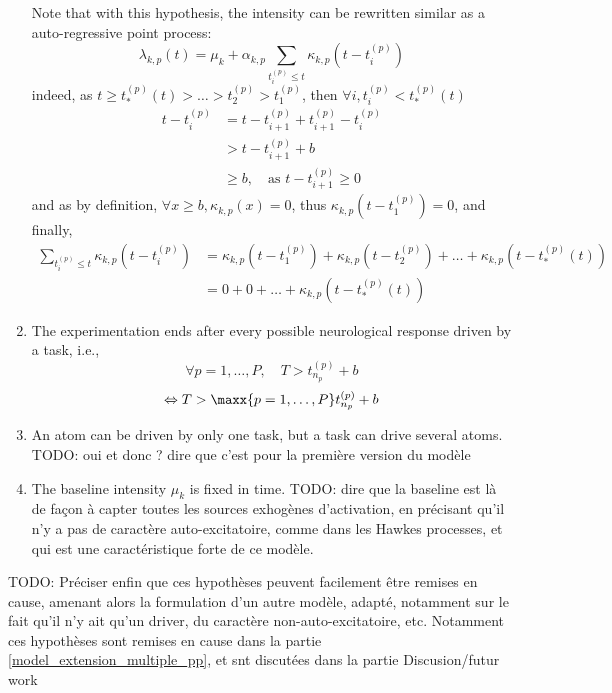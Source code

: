 \begin{enumerate}
    Note that with this hypothesis, the intensity can be rewritten similar as a auto-regressive point process:
    \begin{equation}
        \lambda_{k,p}(t)  = \mu_k + \alpha_{k,p}\sum_{t_i^{(p)} \leq t} \kappa_{k,p}(t - t_i^{(p)})
    \end{equation}
    indeed, as $t \geq t_*^{(p)}(t) > \dots > t_2^{(p)} > t_1^{(p)}$, then $\forall i, t_i^{(p)} < t_*^{(p)}(t)$
    \begin{align*}
        t - t_i^{(p)} &= t - t_{i+1}^{(p)} + t_{i+1}^{(p)} - t_i^{(p)} \\
        &> t - t_{i+1}^{(p)} + b \\
        &\geq b, \quad \text{as } t - t_{i+1}^{(p)}\geq 0
    \end{align*}
    and as by definition, $\forall x \geq b, \kappa_{k,p}(x)=0$, thus $\kappa_{k,p}(t - t_1^{(p)}) = 0$, and finally,
    \begin{align*}
        \sum_{t_i^{(p)} \leq t} \kappa_{k,p}(t - t_i^{(p)}) &= \kappa_{k,p}(t - t_1^{(p)}) + \kappa_{k,p}(t - t_2^{(p)}) + \dots + \kappa_{k,p}(t - t_*^{(p)}(t)) \\
        &= 0 + 0 + \dots + \kappa_{k,p}(t - t_*^{(p)}(t))
    \end{align*}
    
    \item The experimentation ends after every possible neurological response driven by a task, i.e.,
    \begin{equation}\label{eq:long_duration}
        \forall p=1,\dots,P, \quad T > t_{n_p}^{(p)} + b
    \end{equation}
    $$
    \Leftrightarrow T > \maxx{p=1,\dots,P} t_{n_p}^{(p)} + b
    $$
    \item An atom can be driven by only one task, but a task can drive several atoms. TODO: oui et donc ? dire que c'est pour la première version du modèle
    
    \item The baseline intensity $\mu_k$ is fixed in time.
    TODO: dire que la baseline est là de façon à capter toutes les sources exhogènes d'activation, en précisant qu'il n'y a pas de caractère auto-excitatoire, comme dans les Hawkes processes, et qui est une caractéristique forte de ce modèle.
\end{enumerate}

TODO: Préciser enfin que ces hypothèses peuvent facilement être remises en cause, amenant alors  la formulation d'un autre modèle, adapté, notamment sur le fait qu'il n'y ait qu'un driver, du caractère non-auto-excitatoire, etc.
Notamment ces hypothèses sont remises en cause dans la partie \ref{model_extension_multiple_pp}, et snt discutées dans la partie Discusion/futur work